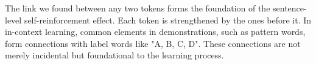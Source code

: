 \documentclass{article} %
\def\elliott#1{{\color{cyan}{\bf [Elliott:} {{#1}}{\bf ]}}}
\begin{document}
The link we found between any two tokens forms the foundation of the sentence-level self-reinforcement effect. Each token is strengthened by the ones before it. 
In in-context learning, common elements in demonstrations, such as pattern words, form connections with label words like "A, B, C, D". These connections are not merely incidental but foundational to the learning process. 







\end{document}
